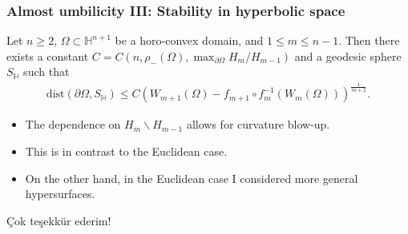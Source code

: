 \documentclass{beamer}
\newcommand{\bs}{\backslash}
\newcommand{\bbH}{\mathbb{H}}
\newcommand{\8}{\infty}
\newcommand{\Om}{\Omega}
\newcommand{\del}{\partial}
\newcommand{\eq}[1]{\begin{equation}\begin{alignedat}{2} #1 \end{alignedat}\end{equation}}
\begin{document}
\begin{frame} 
\frametitle{Almost umbilicity III: Stability in hyperbolic space }
\begin{theorem}\label{Stability AF}
Let $n\geq 2$, $\Omega \subset \mathbb{H}^{n+1}$ be a horo-convex domain, and $1\leq m\leq n-1$. Then there exists a constant  $C= C\left(n,\rho_{-}(\Om),\max_{\del\Om}H_{m}/H_{m-1}\right)$ and a geodesic sphere $S_{\bbH}$ such that
\eq{\label{eq:Stability AF}
\mathrm{dist}(\partial \Omega, S_{\mathbb{H}}) \leq C \left(W_{m+1}(\Omega)-f_{m+1}\circ f_{m}^{-1}\left(W_{m}(\Omega)\right)\right)^{\frac{1}{m+2}}.
}
\end{theorem}  

\begin{itemize}
\item[] The dependence on $H_{m}\bs H_{m-1}$ allows for curvature blow-up.
\item[] This is in contrast to the Euclidean case. 
\item[] On the other hand, in the Euclidean case I considered more general hypersurfaces.
\end{itemize}

\end{frame}





















 







\begin{frame}
\begin{center}\Huge \c{C}ok te\c{s}ekk\"ur ederim! \end{center}

 \end{frame}

















\end{document}
